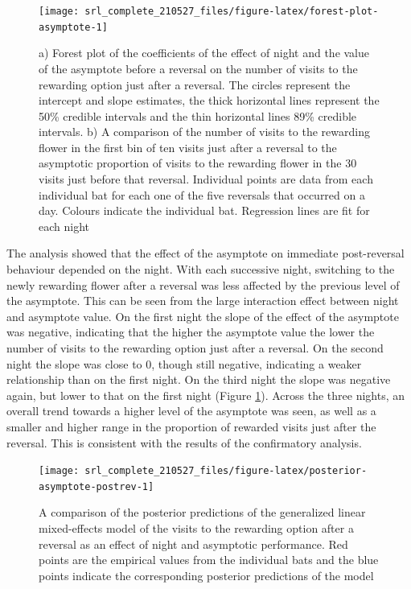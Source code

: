 \documentclass[
]{article}
\begin{document}
\begin{figure}[H]

{\centering \texttt{[image: srl\_complete\_210527\_files/figure-latex/forest-plot-asymptote-1]} 

}

\caption{a) Forest plot of the coefficients of the effect of night and the value of the asymptote before a reversal on the number of visits to the rewarding option just after a reversal. The circles represent the intercept and slope estimates, the thick horizontal lines represent the 50\% credible intervals and the thin horizontal lines 89\% credible intervals. b) A comparison of the number of visits to the rewarding flower in the first bin of ten visits just after a reversal to the asymptotic proportion of visits to the rewarding flower in the 30 visits just before that reversal. Individual points are data from each individual bat for each one of the five reversals that occurred on a day. Colours indicate the individual bat. Regression lines are fit for each night}\label{fig:forest-plot-asymptote}
\end{figure}

The analysis showed that the effect of the asymptote on immediate post-reversal behaviour depended on the night. With each successive night, switching to the newly rewarding flower after a reversal was less affected by the previous level of the asymptote. This can be seen from the large interaction effect between night and asymptote value. On the first night the slope of the effect of the asymptote was negative, indicating that the higher the asymptote value the lower the number of visits to the rewarding option just after a reversal. On the second night the slope was close to 0, though still negative, indicating a weaker relationship than on the first night. On the third night the slope was negative again, but lower to that on the first night (Figure \ref{fig:forest-plot-asymptote}). Across the three nights, an overall trend towards a higher level of the asymptote was seen, as well as a smaller and higher range in the proportion of rewarded visits just after the reversal. This is consistent with the results of the confirmatory analysis.



\begin{figure}[H]

{\centering \texttt{[image: srl\_complete\_210527\_files/figure-latex/posterior-asymptote-postrev-1]} 

}

\caption{A comparison of the posterior predictions of the generalized linear mixed-effects model of the visits to the rewarding option after a reversal as an effect of night and asymptotic performance. Red points are the empirical values from the individual bats and the blue points indicate the corresponding posterior predictions of the model}\label{fig:posterior-asymptote-postrev}
\end{figure}
\end{document}
